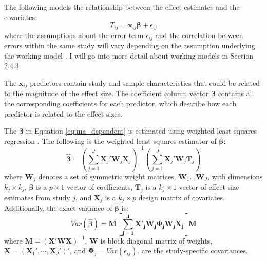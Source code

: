 The following models the relationship between the effect estimates and the covariates:
\begin{equation}\label{eq:ma_dependent}
    T_{ij} = \mathbf{x}_{ij}\boldsymbol{\beta} + \epsilon_{ij}
\end{equation}
where the assumptions about the error term $\epsilon_{ij}$ and the correlation between errors within the same study will vary depending on the assumption underlying the working model \autocite{pustejovsky2022}. I will go into more detail about working models in Section 2.4.3. 



The $\mathbf{x}_{ij}$ predictors contain study and sample characteristics that could be related to the magnitude of the effect size. The coefficient column vector $\bm{\beta}$ contains all the corresponding coefficients for each predictor, which describe how each predictor is related to the effect sizes. 

The $\bm{\beta} $ in Equation \ref{eq:ma_dependent} is estimated using weighted least squares regression \autocite{tipton2015b}. The following is the weighted least squares estimator of $\bm{\beta}$:
\begin{equation}\label{eq:beta_est}
    \bm{\hat{\beta}} = \left( \sum_{j=1}^J \mathbf{X}_j' \mathbf{W}_j \mathbf{X}_j \right)^{-1} \left(\sum_{j=1}^J \mathbf{X}_j' \mathbf{W}_j \mathbf{T}_j  \right)
\end{equation}
where $\mathbf{W}_j$ denotes a set of symmetric weight matrices, $\mathbf{W}_1 \dots \mathbf{W}_J$, with dimensions $k_j \times k_j$, $\boldsymbol{\beta}$ is a $p \times 1$ vector of coefficients, $\mathbf{T}_j$ is a $k_j \times 1$ vector of effect size estimates from study $j$, and $\mathbf{X}_j$ is a $k_j \times p$ design matrix of covariates. Additionally, the exact variance of $\bm{\hat{\beta}}$ is:
\begin{equation}
Var(\bm{\hat{\beta}}) = \mathbf{M \left[\sum_{j=1}^J\mathbf{X}'_j\mathbf{W}_j\mathbf{\Phi}_j\mathbf{W}_j\mathbf{X}_j \right]}\mathbf{M}
\end{equation}
where $\mathbf{M}= (\mathbf{X}'\mathbf{W}\mathbf{X})^{-1}$, $\mathbf{W}$ is block diagonal matrix of weights, $\mathbf{X} = ( \mathbf{X}_1', \cdots, \mathbf{X}_J')'$, and $\mathbf{\Phi}_j = Var(\epsilon_{ij}).$ are the study-specific covariances.

